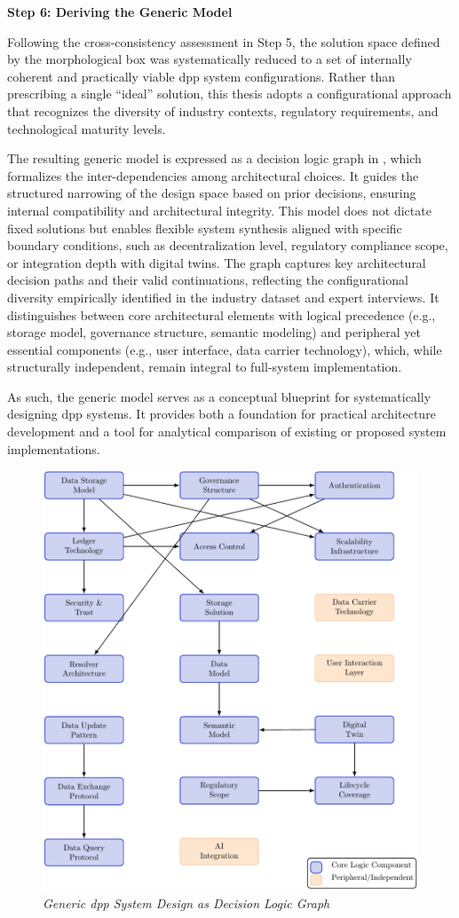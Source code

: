 \textbf{Step 6: Deriving the Generic Model}

Following the cross-consistency assessment in Step 5, the solution space defined by the morphological box was systematically reduced to a set of internally coherent and practically viable \ac{dpp} system configurations. Rather than prescribing a single “ideal” solution, this thesis adopts a configurational approach that recognizes the diversity of industry contexts, regulatory requirements, and technological maturity levels.

The resulting generic model is expressed as a decision logic graph in , which formalizes the inter-dependencies among architectural choices. It guides the structured narrowing of the design space based on prior decisions, ensuring internal compatibility and architectural integrity. This model does not dictate fixed solutions but enables flexible system synthesis aligned with specific boundary conditions, such as decentralization level, regulatory compliance scope, or integration depth with digital twins. The graph captures key architectural decision paths and their valid continuations, reflecting the configurational diversity empirically identified in the industry dataset and expert interviews. It distinguishes between core architectural elements with logical precedence (e.g., storage model, governance structure, semantic modeling) and peripheral yet essential components (e.g., user interface, data carrier technology), which, while structurally independent, remain integral to full-system implementation.

As such, the generic model serves as a conceptual blueprint for systematically designing \ac{dpp} systems. It provides both a foundation for practical architecture development and a tool for analytical comparison of existing or proposed system implementations.

\begin{figure}[!ht]
  \centering
  \includegraphics[width=\textwidth]{figures/dpp_generic_model.pdf}
  \caption{%
    \textit{Generic \ac{dpp} System Design as Decision Logic Graph} 
  }
  \label{fig:dpp_generic_model}
\end{figure}

